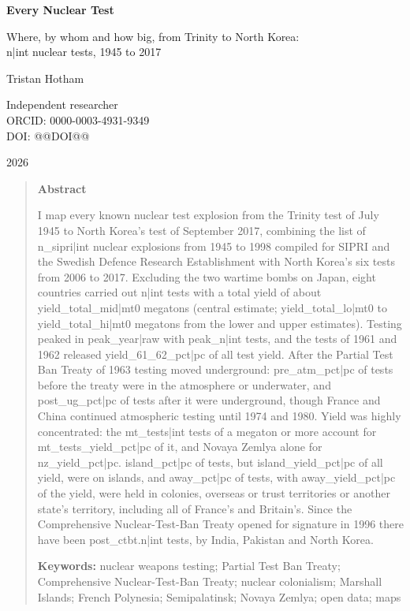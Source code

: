 \documentclass[11pt,a4paper]{article}
\begin{document}
\begin{center}
{\Large\bfseries Every Nuclear Test\par}
\vspace{0.4em}
{\large Where, by whom and how big, from Trinity to North Korea:\\{{n|int}} nuclear tests, 1945 to 2017\par}
\vspace{1.2em}
{\large Tristan Hotham\par}
\vspace{0.3em}
{\small Independent researcher\\
ORCID: 0000-0003-4931-9349\\
DOI: @@DOI@@\par}
\vspace{0.8em}
2026
\end{center}

\begin{quote}
\small
\begin{center}\textbf{Abstract}\end{center}
I map every known nuclear test explosion from the Trinity test of July 1945 to North Korea's test of September 2017, combining the list of {{n_sipri|int}} nuclear explosions from 1945 to 1998 compiled for SIPRI and the Swedish Defence Research Establishment with North Korea's six tests from 2006 to 2017. Excluding the two wartime bombs on Japan, eight countries carried out {{n|int}} tests with a total yield of about {{yield_total_mid|mt0}} megatons (central estimate; {{yield_total_lo|mt0}} to {{yield_total_hi|mt0}} megatons from the lower and upper estimates). Testing peaked in {{peak_year|raw}} with {{peak_n|int}} tests, and the tests of 1961 and 1962 released {{yield_61_62_pct|pc}} of all test yield. After the Partial Test Ban Treaty of 1963 testing moved underground: {{pre_atm_pct|pc}} of tests before the treaty were in the atmosphere or underwater, and {{post_ug_pct|pc}} of tests after it were underground, though France and China continued atmospheric testing until 1974 and 1980. Yield was highly concentrated: the {{mt_tests|int}} tests of a megaton or more account for {{mt_tests_yield_pct|pc}} of it, and Novaya Zemlya alone for {{nz_yield_pct|pc}}. {{island_pct|pc}} of tests, but {{island_yield_pct|pc}} of all yield, were on islands, and {{away_pct|pc}} of tests, with {{away_yield_pct|pc}} of the yield, were held in colonies, overseas or trust territories or another state's territory, including all of France's and Britain's. Since the Comprehensive Nuclear-Test-Ban Treaty opened for signature in 1996 there have been {{post_ctbt.n|int}} tests, by India, Pakistan and North Korea.

\textbf{Keywords:} nuclear weapons testing; Partial Test Ban Treaty; Comprehensive Nuclear-Test-Ban Treaty; nuclear colonialism; Marshall Islands; French Polynesia; Semipalatinsk; Novaya Zemlya; open data; maps
\end{quote}
\end{document}
